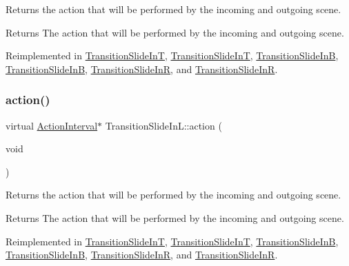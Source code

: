 Returns the action that will be performed by the incoming and outgoing scene.

\begin{DoxyReturn}{Returns}
The action that will be performed by the incoming and outgoing scene. 
\end{DoxyReturn}


Reimplemented in \hyperlink{classTransitionSlideInT_a47099107f7fdb8ca5f5f16f66a5c6670}{Transition\+Slide\+InT}, \hyperlink{classTransitionSlideInT_a014b428d93b31e8ef5075865a5de9c63}{Transition\+Slide\+InT}, \hyperlink{classTransitionSlideInB_a512b4ad5aae8a5b408438a535a4b146e}{Transition\+Slide\+InB}, \hyperlink{classTransitionSlideInB_ad67db28968c6152f4412bb86fd0fd4ef}{Transition\+Slide\+InB}, \hyperlink{classTransitionSlideInR_a8b573f57d622f77739e36a03e9b80d3a}{Transition\+Slide\+InR}, and \hyperlink{classTransitionSlideInR_a62161e5858110ef0122d98377f9a2cb7}{Transition\+Slide\+InR}.

\mbox{\label{classTransitionSlideInL_a8941f67b56e12f0f1462aac0c9e5727a}} 
\subsubsection{\texorpdfstring{action()}{action()}\hspace{0.1cm}{\footnotesize\ttfamily [2/2]}}
{\footnotesize\ttfamily virtual \hyperlink{classActionInterval}{Action\+Interval}$\ast$ Transition\+Slide\+In\+L\+::action (\begin{DoxyParamCaption}\item[{void}]{ }\end{DoxyParamCaption})\hspace{0.3cm}{\ttfamily [virtual]}}

Returns the action that will be performed by the incoming and outgoing scene.

\begin{DoxyReturn}{Returns}
The action that will be performed by the incoming and outgoing scene. 
\end{DoxyReturn}


Reimplemented in \hyperlink{classTransitionSlideInT_a47099107f7fdb8ca5f5f16f66a5c6670}{Transition\+Slide\+InT}, \hyperlink{classTransitionSlideInT_a014b428d93b31e8ef5075865a5de9c63}{Transition\+Slide\+InT}, \hyperlink{classTransitionSlideInB_a512b4ad5aae8a5b408438a535a4b146e}{Transition\+Slide\+InB}, \hyperlink{classTransitionSlideInB_ad67db28968c6152f4412bb86fd0fd4ef}{Transition\+Slide\+InB}, \hyperlink{classTransitionSlideInR_a8b573f57d622f77739e36a03e9b80d3a}{Transition\+Slide\+InR}, and \hyperlink{classTransitionSlideInR_a62161e5858110ef0122d98377f9a2cb7}{Transition\+Slide\+InR}.

